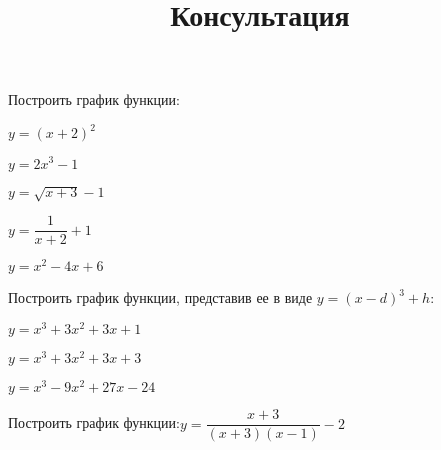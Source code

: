 \newpage
\title{Консультация}
\begin{listofex}
	\item Построить график функции:
	\begin{enumcols}[itemcolumns=2]
		\item \( y=(x+2)^2 \)
		\item \( y=2x^3-1 \)
		\item \( y=\sqrt{x+3}-1 \)
		\item \( y=\dfrac{1}{x+2}+1 \)
		\item \( y=x^2-4x+6 \)
	\end{enumcols}
	\item Построить график функции, представив ее в виде \( y=(x-d)^3+h \):
	\begin{enumcols}[itemcolumns=2]
		\item \( y=x^3+3x^2+3x+1 \)
		\item \( y=x^3+3x^2+3x+3 \)
		\item \( y=x^3-9x^2+27x-24 \)
	\end{enumcols}
	\item Построить график функции:\quad\( y=\dfrac{x+3}{(x+3)(x-1)}-2 \)
\end{listofex}